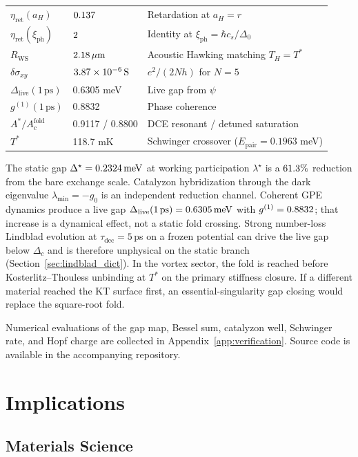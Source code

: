 \documentclass[11pt,letterpaper]{article}
\begin{document}
\begin{table}[htbp]
\begin{tabular}{lll}
$\eta_{\text{ret}}(a_H)$ & $0.137$ & Retardation at $a_H=r$ \\
$\eta_{\text{ret}}(\xi_{\mathrm{ph}})$ & $2$ & Identity at $\xi_{\mathrm{ph}}=\hbar c_s/\Delta_0$ \\
$R_{\mathrm{WS}}$ & $2.18\,\mu\mathrm{m}$ & Acoustic Hawking matching $T_H=T^*$ \\
$\delta\sigma_{xy}$ & $3.87\times 10^{-6}\,\mathrm{S}$ & $e^2/(2Nh)$ for $N=5$ \\
$\Delta_{\mathrm{live}}(1\,\text{ps})$ & 0.6305 meV & Live gap from $\psi$ \\
$g^{(1)}(1\,\text{ps})$ & 0.8832 & Phase coherence \\
$A^*/A_c^{\mathrm{fold}}$ & 0.9117 / 0.8800 & DCE resonant / detuned saturation \\
$T^*$ & 118.7 mK & Schwinger crossover ($E_{\mathrm{pair}}=0.1963$ meV) \\
\hline
\end{tabular}
\label{tab:parameters}
\end{table}

The static gap $\Delta^\star=0.2324\,\mathrm{meV}$ at working participation $\lambda^\star$ is a $61.3\%$ reduction from the bare exchange scale. Catalyzon hybridization through the dark eigenvalue $\lambda_{\min}=-g_0$ is an independent reduction channel. Coherent GPE dynamics produce a live gap $\Delta_{\mathrm{live}}(1\,\mathrm{ps})=0.6305\,\mathrm{meV}$ with $g^{(1)}=0.8832$; that increase is a dynamical effect, not a static fold crossing. Strong number-loss Lindblad evolution at $\tau_{\mathrm{dec}}=5$\,ps on a frozen potential can drive the live gap below $\Delta_c$ and is therefore unphysical on the static branch (Section~\ref{sec:lindblad_dict}). In the vortex sector, the fold is reached before Kosterlitz--Thouless unbinding at $T^*$ on the primary stiffness closure. If a different material reached the KT surface first, an essential-singularity gap closing would replace the square-root fold.

Numerical evaluations of the gap map, Bessel sum, catalyzon well, Schwinger rate, and Hopf charge are collected in Appendix~\ref{app:verification}. Source code is available in the accompanying repository.

\section{Implications}
\label{sec:implications}

\subsection{Materials Science}
\end{document}
